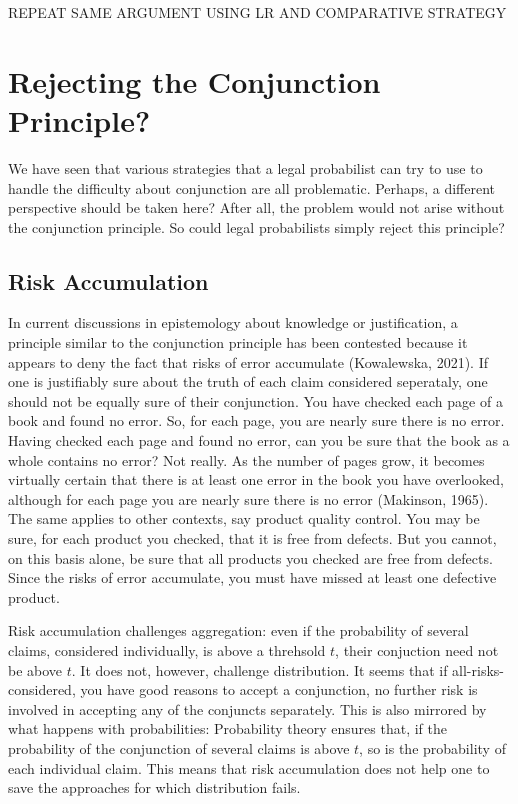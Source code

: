 \documentclass[
  10pt,
  dvipsnames,enabledeprecatedfontcommands]{scrartcl}
\begin{document}
REPEAT SAME ARGUMENT USING LR AND COMPARATIVE STRATEGY

\hypertarget{rejecting-the-conjunction-principle}{%
\section{Rejecting the Conjunction
Principle?}\label{rejecting-the-conjunction-principle}}

We have seen that various strategies that a legal probabilist can try to
use to handle the difficulty about conjunction are all problematic.
Perhaps, a different perspective should be taken here? After all, the
problem would not arise without the conjunction principle. So could
legal probabilists simply reject this principle?

\hypertarget{risk-accumulation}{%
\subsection{Risk Accumulation}\label{risk-accumulation}}

In current discussions in epistemology about knowledge or justification,
a principle similar to the conjunction principle has been contested
because it appears to deny the fact that risks of error accumulate
(Kowalewska, 2021). If one is justifiably sure about the truth of each
claim considered seperataly, one should not be equally sure of their
conjunction. You have checked each page of a book and found no error.
So, for each page, you are nearly sure there is no error. Having checked
each page and found no error, can you be sure that the book as a whole
contains no error? Not really. As the number of pages grow, it becomes
virtually certain that there is at least one error in the book you have
overlooked, although for each page you are nearly sure there is no error
(Makinson, 1965). The same applies to other contexts, say product
quality control. You may be sure, for each product you checked, that it
is free from defects. But you cannot, on this basis alone, be sure that
all products you checked are free from defects. Since the risks of error
accumulate, you must have missed at least one defective product.

Risk accumulation challenges aggregation: even if the probability of
several claims, considered individually, is above a threhsold \(t\),
their conjuction need not be above \(t\). It does not, however,
challenge distribution. It seems that if all-risks-considered, you have
good reasons to accept a conjunction, no further risk is involved in
accepting any of the conjuncts separately. This is also mirrored by what
happens with probabilities: Probability theory ensures that, if the
probability of the conjunction of several claims is above \(t\), so is
the probability of each individual claim. This means that risk
accumulation does not help one to save the approaches for which
distribution fails.
\end{document}
